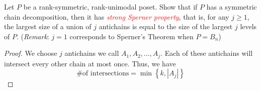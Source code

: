\documentclass[11pt]{scrartcl}
\begin{document}
\begin{problem}[\textcolor{red}{A generalization of Sperner's Thm}]
    Let $P$ be a rank-symmetric, rank-unimodal poset. Show that if $P$ has a symmetric chain decomposition, then it has \textcolor{red}{\textit{strong Sperner property}}, that is, for any $j\ge 1$, the largest size of a union of $j$ antichains is equal to the size of the largest $j$ levels of $P$. (\textit{Remark}: $j=1$ corresponds to Sperner's Theorem when $P=B_n$)
\end{problem}

\begin{proof}
    We choose $j$ antichains we call $A_1, A_2, \ldots, A_j$. Each of these antichains will intersect every other chain at most once. Thus, we have 
    \[
        \textrm{\# of intersections} = \min{\left\{k, |A_j|\right\}}
    \]
\end{proof}
\end{document}
